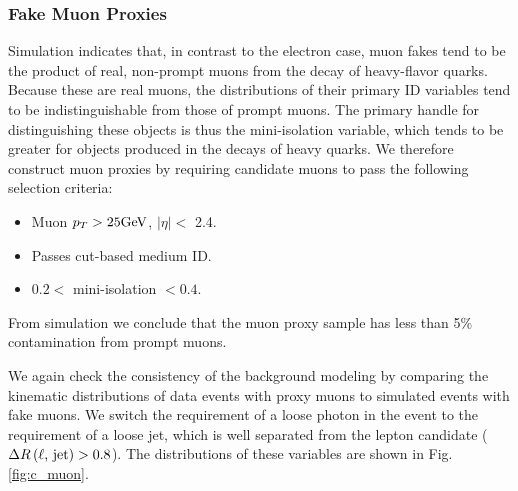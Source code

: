 \documentclass[thesis.tex]{subfiles}
\renewcommand\_{\textunderscore\allowbreak}
\begin{document}
\subsubsection{Fake Muon Proxies}

Simulation indicates that, in contrast to the electron case, muon fakes tend to
be the product of real, non-prompt muons from the decay of heavy-flavor quarks.
Because these are real muons, the distributions of their primary ID variables
tend to be indistinguishable from those of prompt muons. The primary handle for
distinguishing these objects is thus the mini-isolation variable, which tends
to be greater for objects produced in the decays of heavy quarks. We therefore
construct muon proxies by requiring candidate muons to pass the following
selection criteria:
\begin{itemize}
    \item Muon $p_T > 25\text{GeV}$, $|\eta| <$ 2.4.
    \item Passes cut-based medium ID.
    \item $0.2 <$ mini-isolation $< 0.4$.
\end{itemize}
From simulation we conclude that the muon proxy sample has less than 5\%
contamination from prompt muons.

We again check the consistency of the background modeling by comparing the
kinematic distributions of data events with proxy muons to simulated events
with fake muons. We switch the requirement of a loose photon in the event
to the requirement of a loose jet, which is well separated from the lepton candidate
($\Delta R\left(\textrm{\ensuremath{\ell}, jet}\right) > 0.8$). The distributions of these
variables are shown in Fig. \ref{fig:c_muon}. 
\end{document}
